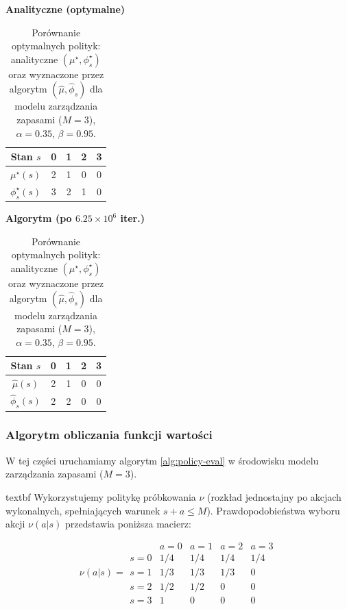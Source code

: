 \begin{table}[h!]
\centering
\caption{Porównanie optymalnych polityk: analityczne $(\mu^\star,\phi_s^\star)$ oraz wyznaczone przez algorytm $(\hat{\mu},\hat{\phi}_s)$ dla modelu zarządzania zapasami ($M=3$), $\alpha=0.35$, $\beta=0.95$.}
\label{tab:inv_m3_policies_comparison}
\begin{minipage}[t]{0.48\textwidth}
\centering
\textbf{Analityczne (optymalne)}\\
\vspace{4pt}
\begin{tabular}{c|cccc}
	\toprule
Stan $s$ & 0 & 1 & 2 & 3 \\
\midrule
$\mu^\star(s)$ & 2 & 1 & 0 & 0 \\
$\phi_s^\star(s)$ & 3 & 2 & 1 & 0 \\
\bottomrule
\end{tabular}
\end{minipage}
\hfill
\begin{minipage}[t]{0.48\textwidth}
\centering
\textbf{Algorytm (po $6.25\times10^6$ iter.)}\\
\vspace{4pt}
\begin{tabular}{c|cccc}
	\toprule
Stan $s$ & 0 & 1 & 2 & 3 \\
\midrule
$\hat{\mu}(s)$ & 2 & 1 & 0 & 0 \\
$\hat{\phi}_s(s)$ & 2 & 2 & 0 & 0 \\
\bottomrule
\end{tabular}
\end{minipage}
\end{table}


\subsubsection{Algorytm obliczania funkcji wartości}

W tej części uruchamiamy algorytm \ref{alg:policy-eval} w środowisku modelu zarządzania zapasami ($M=3$).

\csname textbf Wykorzystujemy politykę próbkowania $\nu$ (rozkład jednostajny po akcjach wykonalnych, spełniających warunek $s+a\le M$). Prawdopodobieństwa wyboru akcji $\nu(a|s)$ przedstawia poniższa macierz:

\[
\nu(a|s) = \begin{array}{c|cccc}
	& a=0 & a=1 & a=2 & a=3 \\
	\hline
	s=0 & 1/4 & 1/4 & 1/4 & 1/4 \\
	s=1 & 1/3 & 1/3 & 1/3 & 0 \\
	s=2 & 1/2 & 1/2 & 0 & 0 \\
	s=3 & 1 & 0 & 0 & 0
\end{array}
\]

